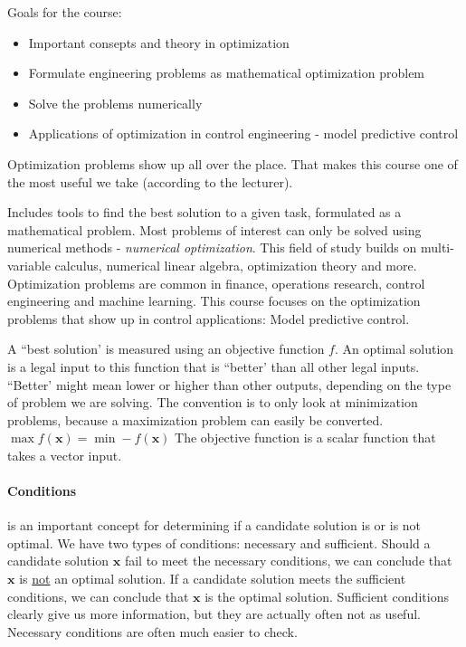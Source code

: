 \documentclass{article}
\begin{document}
\maketitle

Goals for the course:

\begin{itemize}
  \item Important consepts and theory in optimization
  \item Formulate engineering problems as mathematical optimization problem
  \item Solve the problems numerically
  \item Applications of optimization in control engineering - model predictive control
\end{itemize}

Optimization problems show up all over the place. That makes this course one of the most useful
we take (according to the lecturer).


Includes tools to find the best solution to a given task, formulated as a mathematical problem. Most problems of interest can
only be solved using numerical methods - \textit{numerical optimization}. This field of study builds
on multi-variable calculus, numerical linear algebra, optimization theory and more.
Optimization problems are common in finance, operations research, control engineering and machine learning.
This course focuses on the optimization problems that show up in control applications: Model predictive control.

\medskip

A ``best solution' is measured using an objective function $\textit{f}$. An optimal solution is a legal input to this function
that is ``better' than all other legal inputs. ``Better' might mean lower or higher than other outputs, depending on the type of problem we are solving. The convention
is to only look at minimization problems, because a maximization problem can easily be converted. $\max f(\mathbf{x}) = \min -f(\mathbf{x})$
The objective function is a scalar function that takes a vector input.

\paragraph{Conditions} is an important concept for determining if a candidate solution is or is not optimal. We have two types of conditions:
necessary and sufficient. Should a candidate solution $\mathbf{x}$ fail to meet the necessary conditions, we can conclude that $\mathbf{x}$ is \underline{not} an optimal solution. If a candidate solution meets the sufficient conditions, we can conclude that $\mathbf{x}$ is the optimal solution.
Sufficient conditions clearly give us more information, but they are actually often not as useful. Necessary conditions are often much easier to check.
\end{document}
